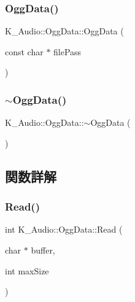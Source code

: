 \subsubsection{\texorpdfstring{Ogg\+Data()}{OggData()}}
{\footnotesize\ttfamily K\+\_\+\+Audio\+::\+Ogg\+Data\+::\+Ogg\+Data (\begin{DoxyParamCaption}\item[{const char $\ast$}]{file\+Pass }\end{DoxyParamCaption})}

\mbox{\label{class_k___audio_1_1_ogg_data_a60aee716522004f16e11203677d3f63b}} 
\subsubsection{\texorpdfstring{$\sim$\+Ogg\+Data()}{~OggData()}}
{\footnotesize\ttfamily K\+\_\+\+Audio\+::\+Ogg\+Data\+::$\sim$\+Ogg\+Data (\begin{DoxyParamCaption}{ }\end{DoxyParamCaption})}



\subsection{関数詳解}
\mbox{\label{class_k___audio_1_1_ogg_data_ac4c50916e0f2eaa384539b2dbedc1d6e}} 
\subsubsection{\texorpdfstring{Read()}{Read()}}
{\footnotesize\ttfamily int K\+\_\+\+Audio\+::\+Ogg\+Data\+::\+Read (\begin{DoxyParamCaption}\item[{char $\ast$}]{buffer,  }\item[{int}]{max\+Size }\end{DoxyParamCaption})\hspace{0.3cm}{\ttfamily [virtual]}}



